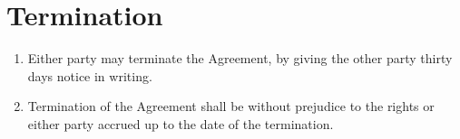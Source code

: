 \documentclass[nz-terms]{subfiles}
\begin{document}
\section{Termination}

\begin{enumerate}
\item Either party may terminate the Agreement, by giving the other party thirty
days notice in writing.
\item Termination of the Agreement shall be without prejudice to the rights or
either party accrued up to the date of the termination.
\end{enumerate}
\end{document}
